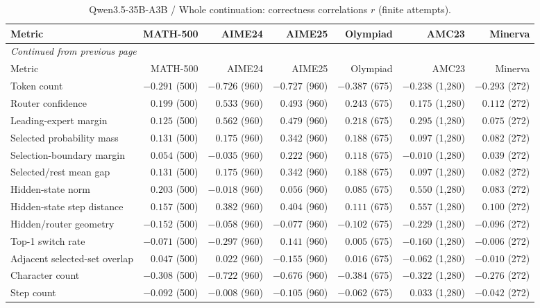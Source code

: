 \begingroup\scriptsize\setlength{\tabcolsep}{4pt}
\begin{longtable}{@{}lrrrrrr@{}}
\caption{Qwen3.5-35B-A3B / Whole continuation: correctness correlations $r$ (finite attempts).}\label{tab:multi-qwen-continuation}\\
\toprule
Metric & MATH-500 & AIME24 & AIME25 & Olympiad & AMC23 & Minerva \\
\midrule\endfirsthead
\multicolumn{7}{l}{\textit{Continued from previous page}}\\
\toprule
Metric & MATH-500 & AIME24 & AIME25 & Olympiad & AMC23 & Minerva \\
\midrule\endhead
\bottomrule\endfoot
Token count & $-0.291$ (500) & $-0.726$ (960) & $-0.727$ (960) & $-0.387$ (675) & $-0.238$ (1,280) & $-0.293$ (272) \\
Router confidence & $0.199$ (500) & $0.533$ (960) & $0.493$ (960) & $0.243$ (675) & $0.175$ (1,280) & $0.112$ (272) \\
Leading-expert margin & $0.125$ (500) & $0.562$ (960) & $0.479$ (960) & $0.218$ (675) & $0.295$ (1,280) & $0.075$ (272) \\
Selected probability mass & $0.131$ (500) & $0.175$ (960) & $0.342$ (960) & $0.188$ (675) & $0.097$ (1,280) & $0.082$ (272) \\
Selection-boundary margin & $0.054$ (500) & $-0.035$ (960) & $0.222$ (960) & $0.118$ (675) & $-0.010$ (1,280) & $0.039$ (272) \\
Selected/rest mean gap & $0.131$ (500) & $0.175$ (960) & $0.342$ (960) & $0.188$ (675) & $0.097$ (1,280) & $0.082$ (272) \\
Hidden-state norm & $0.203$ (500) & $-0.018$ (960) & $0.056$ (960) & $0.085$ (675) & $0.550$ (1,280) & $0.083$ (272) \\
Hidden-state step distance & $0.157$ (500) & $0.382$ (960) & $0.404$ (960) & $0.111$ (675) & $0.557$ (1,280) & $0.100$ (272) \\
Hidden/router geometry & $-0.152$ (500) & $-0.058$ (960) & $-0.077$ (960) & $-0.102$ (675) & $-0.229$ (1,280) & $-0.096$ (272) \\
Top-1 switch rate & $-0.071$ (500) & $-0.297$ (960) & $0.141$ (960) & $0.005$ (675) & $-0.160$ (1,280) & $-0.006$ (272) \\
Adjacent selected-set overlap & $0.047$ (500) & $0.022$ (960) & $-0.155$ (960) & $0.016$ (675) & $-0.062$ (1,280) & $-0.010$ (272) \\
Character count & $-0.308$ (500) & $-0.722$ (960) & $-0.676$ (960) & $-0.384$ (675) & $-0.322$ (1,280) & $-0.276$ (272) \\
Step count & $-0.092$ (500) & $-0.008$ (960) & $-0.105$ (960) & $-0.062$ (675) & $0.033$ (1,280) & $-0.042$ (272) \\
\end{longtable}\endgroup

